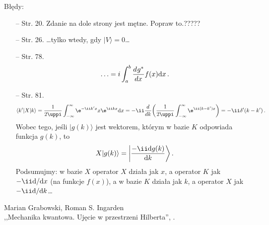 \documentclass[a4paper,11pt]{article}
\begin{document}
Błędy:\\
\begin{itemize}
\item[--] Str. 20. Zdanie na dole strony jest mętne. Popraw to.?????
\item[--] Str. 26. \ldots tylko wtedy, gdy $| V \rangle = 0$\ldots
\item[--] Str. 78. %
  $$\ldots = i \int_{a}^{b} \frac{ d^{  } {  g^{ * }  } }{ d {  x  }^{  } } f( x ) \mathrm{d} x \,
  .$$
\item[--] Str. 81.
  $$\langle k' | X | k \rangle = \frac{ 1 }{ 2 \uppi } \int_{ -\infty
  }^{ \infty } \e^{ -\ii k' x } x \e^{ \ii k x } \de x = -\ii \dd{}{}{
    k } \bigg( \frac{ 1 }{ 2 \uppi } \int_{ -\infty }^{ \infty } \e^{
    \ii ( k - k' ) x } \bigg) = -\ii \delta'( k - k' ) \, .$$ Wobec
  tego, jeśli $| g( k ) \rangle$ jest wektorem, którym w bazie $K$
  odpowiada funkcja $g( k )$, to
$$X| g( k ) \rangle = \bigg| \frac{ -\ii \de g( k ) }{ \de k } \bigg\rangle \, .$$
Podsumujmy: w bazie $X$ operator $X$ działa jak $x$, a operator $K$
jak $-\ii \de / \de x$ (na funkcje $f( x )$), a w bazie $K$ działa jak
$k$, a operator $X$ jak $-\ii \de / \de k$\ldots
\end{itemize}
\newpage



\begin{center}
  Marian Grabowski, Roman S. Ingarden\\
  ,,Mechanika kwantowa. Ujęcie w przestrzeni Hilberta'',
  \cite{MGRIMKUPH}.
\end{center}
\end{document}
